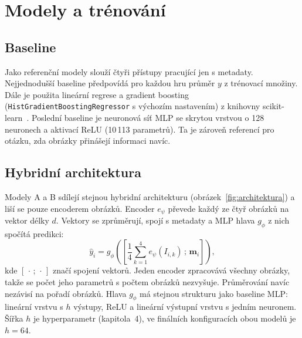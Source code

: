 \section{Modely a trénování}

\subsection*{Baseline}

Jako referenční modely slouží čtyři přístupy pracující jen s metadaty. Nejjednodušší baseline
předpovídá pro každou hru průměr $y$ z trénovací množiny. Dále je použita lineární regrese
a gradient boosting (\texttt{HistGradientBoostingRegressor} s výchozím nastavením) z knihovny
scikit-learn~\cite{pedregosa2011sklearn}. Poslední baseline je neuronová síť MLP se skrytou
vrstvou o 128 neuronech a aktivací ReLU (10\,113 parametrů). Ta je zároveň referencí pro otázku,
zda obrázky přinášejí informaci navíc.

\subsection*{Hybridní architektura}

Modely A a B sdílejí stejnou hybridní architekturu (obrázek~\ref{fig:architektura}) a liší se
pouze encoderem obrázků. Encoder $e_\psi$ převede každý ze čtyř obrázků na vektor délky $d$.
Vektory se zprůměrují, spojí s metadaty a MLP hlava $g_\phi$ z nich spočítá predikci:
\begin{equation}
    \hat{y}_i = g_\phi\left(\left[\frac{1}{4} \sum_{k=1}^{4} e_\psi(I_{i,k}) \,;\, \mathbf{m}_i\right]\right),
\end{equation}
kde $[\,\cdot\,;\,\cdot\,]$ značí spojení vektorů. Jeden encoder zpracovává všechny obrázky,
takže se počet jeho parametrů s počtem obrázků nezvyšuje. Průměrování navíc nezávisí na pořadí
obrázků. Hlava $g_\phi$ má stejnou strukturu jako baseline MLP: lineární vrstvu s $h$ výstupy,
ReLU a lineární výstupní vrstvu s jedním neuronem. Šířka $h$ je hyperparametr (kapitola~4),
ve finálních konfiguracích obou modelů je $h = 64$.

